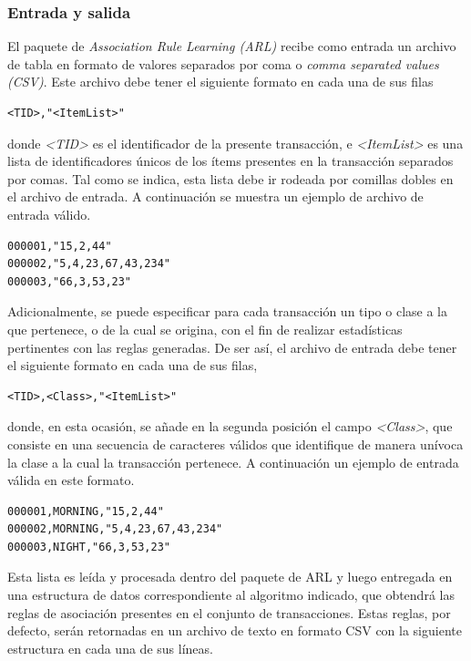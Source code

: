 \subsubsection{Entrada y salida}

El paquete de \textit{Association Rule Learning (ARL)} recibe como entrada un archivo de tabla en formato de valores separados por coma o \textit{comma separated values (CSV)}. Este archivo debe tener el siguiente formato en cada una de sus filas

\begin{lstlisting}[basicstyle=\ttfamily]
<TID>,"<ItemList>"
\end{lstlisting}

donde \textit{<TID>} es el identificador de la presente transacción, e \textit{<ItemList>} es una lista de identificadores únicos de los ítems presentes en la transacción separados por comas. Tal como se indica, esta lista debe ir rodeada por comillas dobles en el archivo de entrada. A continuación se muestra un ejemplo de archivo de entrada válido.

\begin{lstlisting}[basicstyle=\ttfamily]
000001,"15,2,44"
000002,"5,4,23,67,43,234"
000003,"66,3,53,23"
\end{lstlisting}

Adicionalmente, se puede especificar para cada transacción un tipo o clase a la que pertenece, o de la cual se origina, con el fin de realizar estadísticas pertinentes con las reglas generadas. De ser así, el archivo de entrada debe tener el siguiente formato en cada una de sus filas,

\begin{lstlisting}[basicstyle=\ttfamily]
<TID>,<Class>,"<ItemList>"
\end{lstlisting}

donde, en esta ocasión, se añade en la segunda posición el campo \textit{<Class>}, que consiste en una secuencia de caracteres válidos que identifique de manera unívoca la clase a la cual la transacción pertenece. A continuación un ejemplo de entrada válida en este formato.

\begin{lstlisting}[basicstyle=\ttfamily]
000001,MORNING,"15,2,44"
000002,MORNING,"5,4,23,67,43,234"
000003,NIGHT,"66,3,53,23"
\end{lstlisting}

Esta lista es leída y procesada dentro del paquete de ARL y luego entregada en una estructura de datos correspondiente al algoritmo indicado, que obtendrá las reglas de asociación presentes en el conjunto de transacciones. Estas reglas, por defecto, serán retornadas en un archivo de texto en formato CSV con la siguiente estructura en cada una de sus líneas.

